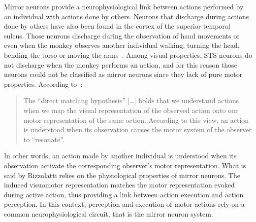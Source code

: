Mirror neurons provide a neurophysiological link between actions performed 
by an individual with actions done by others.
Neurons that discharge during actions done by others have also been found in the
cortex of the superior temporal sulcus. 
Those neurons discharge during the observation of hand movements or even when
the monkey observes another individual walking, turning the head, bending the 
torso or moving the arms~\citep{rizzolatti.craighero:2004}.
Among visual properties, STS neurons do not discharge when the monkey performs
an action, and for this reason those neurons could not be classified as mirror
neurons since they lack of pure motor properties.
According to~\citet{rizzolatti.etal:2001}:
\begin{quote}
The ``direct matching hypothesis'' [\ldots] holds that we understand
actions when we map the visual representation of the observed action onto our
motor representation of the same action.
According to this view, an action is understood when its observation causes
the motor system of the observer to ``resonate''. 
\end{quote}
In other words, an action made by another individual is understood when its
observation activate the corresponding observer's motor representation.
What is said by Rizzolatti relies on the physiological properties of mirror
neurons. 
The induced visuomotor representation  
matches the motor representation evoked during active action, thus providing a 
link between action execution and action perception.
In this context, perception and execution of motor actions rely
on a common neurophysiological circuit, that is the mirror neuron
system.
